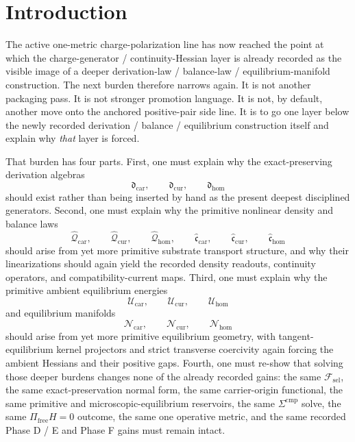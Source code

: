 \documentclass[11pt]{article}
\newcommand{\StemFunctional}{\mathscr F_{\mathrm{sel}}}
\newcommand{\TensorDerAlg}{\mathfrak d_{\mathrm{car}}}
\newcommand{\CurDerAlg}{\mathfrak d_{\mathrm{cur}}}
\newcommand{\HomDerAlg}{\mathfrak d_{\mathrm{hom}}}
\newcommand{\TensorPrimitiveDensity}{\widehat{\mathcal Q}_{\mathrm{car}}}
\newcommand{\CurPrimitiveDensity}{\widehat{\mathcal Q}_{\mathrm{cur}}}
\newcommand{\HomPrimitiveDensity}{\widehat{\mathcal Q}_{\mathrm{hom}}}
\newcommand{\TensorBalance}{\widehat{\mathfrak c}_{\mathrm{car}}}
\newcommand{\CurBalance}{\widehat{\mathfrak c}_{\mathrm{cur}}}
\newcommand{\HomBalance}{\widehat{\mathfrak c}_{\mathrm{hom}}}
\newcommand{\TensorAmbientEnergy}{\mathcal U_{\mathrm{car}}}
\newcommand{\CurAmbientEnergy}{\mathcal U_{\mathrm{cur}}}
\newcommand{\HomAmbientEnergy}{\mathcal U_{\mathrm{hom}}}
\newcommand{\TensorEqManifold}{\mathcal N_{\mathrm{car}}}
\newcommand{\CurEqManifold}{\mathcal N_{\mathrm{cur}}}
\newcommand{\HomEqManifold}{\mathcal N_{\mathrm{hom}}}
\begin{document}
\section{Introduction}

The active one-metric charge-polarization line has now reached the point at which the charge-generator / continuity-Hessian layer is already recorded as the visible image of a deeper derivation-law / balance-law / equilibrium-manifold construction. The next burden therefore narrows again. It is not another packaging pass. It is not stronger promotion language. It is not, by default, another move onto the anchored positive-pair side line. It is to go one layer below the newly recorded derivation / balance / equilibrium construction itself and explain why \emph{that} layer is forced.

That burden has four parts. First, one must explain why the exact-preserving derivation algebras
\[
\TensorDerAlg,\qquad
\CurDerAlg,\qquad
\HomDerAlg
\]
should exist rather than being inserted by hand as the present deepest disciplined generators. Second, one must explain why the primitive nonlinear density and balance laws
\[
\TensorPrimitiveDensity,\qquad
\CurPrimitiveDensity,\qquad
\HomPrimitiveDensity,
\qquad
\TensorBalance,\qquad
\CurBalance,\qquad
\HomBalance
\]
should arise from yet more primitive substrate transport structure, and why their linearizations should again yield the recorded density readouts, continuity operators, and compatibility-current maps. Third, one must explain why the primitive ambient equilibrium energies
\[
\TensorAmbientEnergy,\qquad
\CurAmbientEnergy,\qquad
\HomAmbientEnergy
\]
and equilibrium manifolds
\[
\TensorEqManifold,\qquad
\CurEqManifold,\qquad
\HomEqManifold
\]
should arise from yet more primitive equilibrium geometry, with tangent-equilibrium kernel projectors and strict transverse coercivity again forcing the ambient Hessians and their positive gaps. Fourth, one must re-show that solving those deeper burdens changes none of the already recorded gains: the same \(\StemFunctional\), the same exact-preservation normal form, the same carrier-origin functional, the same primitive and microscopic-equilibrium reservoirs, the same \(\Sigma^{\mathrm{cmp}}\) solve, the same \(\Pi_{\mathrm{free}}H=0\) outcome, the same one operative metric, and the same recorded Phase D / E and Phase F gains must remain intact.
\end{document}
